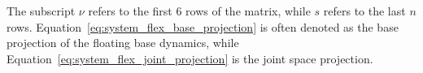 The subscript $\nu$ refers to the first $6$ rows of the matrix, while $s$ refers to the last $n$
rows. Equation~\eqref{eq:system_flex_base_projection} is often denoted as the base projection of the floating base dynamics, while
Equation~\eqref{eq:system_flex_joint_projection} is the joint space projection.
